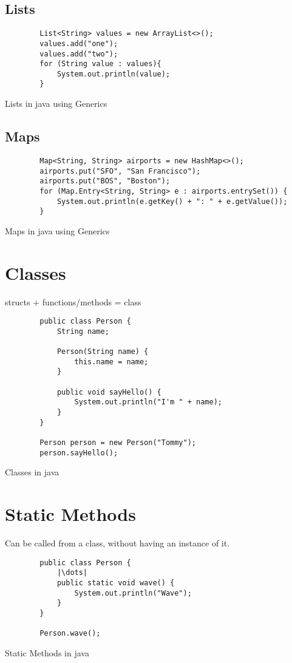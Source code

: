 \subsection{Lists}
\begin{code}
	\begin{verbatim}
		List<String> values = new ArrayList<>();
		values.add("one");
		values.add("two");
		for (String value : values){
			System.out.println(value);
		}
	\end{verbatim}
	\caption{Lists in java using Generics}
\end{code}

\subsection{Maps}
\begin{code}
	\begin{verbatim}
		Map<String, String> airports = new HashMap<>();
		airports.put("SFO", "San Francisco");
		airports.put("BOS", "Boston");
		for (Map.Entry<String, String> e : airports.entrySet()) {
			System.out.println(e.getKey() + ": " + e.getValue());
		}
	\end{verbatim}
	\caption{Maps in java using Generics}
\end{code}

\section{Classes}
structs + functions/methods = class

\begin{code}
	\begin{verbatim}
		public class Person {
			String name;

			Person(String name) {
				this.name = name;
			}

			public void sayHello() {
				System.out.println("I'm " + name);
			}
		}

		Person person = new Person("Tommy");
		person.sayHello();
	\end{verbatim}
	\caption{Classes in java}
\end{code}

\section{Static Methods}
Can be called from a class, without having an instance of it.

\begin{code}
	\begin{verbatim}
		public class Person {
			|\dots|
			public static void wave() {
				System.out.println("Wave");
			}
		}

		Person.wave();
	\end{verbatim}
	\caption{Static Methods in java}
\end{code}

